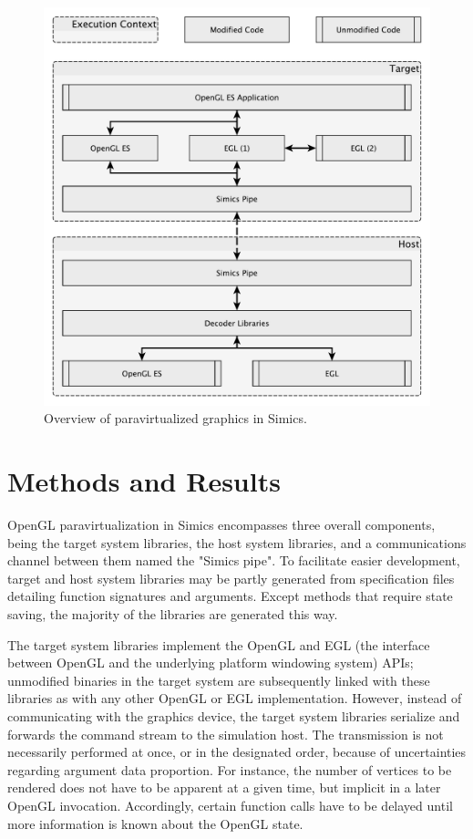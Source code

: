 
\begin{figure}
\setlength{\abovecaptionskip}{0pt}
\setlength{\belowcaptionskip}{0pt}
\centering
\includegraphics[width=\linewidth]{img/yedoverview.pdf}
\caption{Overview of paravirtualized graphics in Simics.}
\label{fig:overview}
\end{figure}

\section{Methods and Results}
\label{sec:methodsandresults}
OpenGL paravirtualization in Simics encompasses three overall components, being the target system libraries, the host system libraries, and a communications channel between them named the "Simics pipe".
To facilitate easier development, target and host system libraries may be partly generated from specification files detailing function signatures and arguments.
Except methods that require state saving, the majority of the libraries are generated this way.

The target system libraries implement the OpenGL and EGL (the interface between OpenGL and the underlying platform windowing system) APIs; unmodified binaries in the target system are subsequently linked with these libraries as with any other OpenGL or EGL implementation.
However, instead of communicating with the graphics device, the target system libraries serialize and forwards the command stream to the simulation host.
The transmission is not necessarily performed at once, or in the designated order, because of uncertainties regarding argument data proportion.
For instance, the number of vertices to be rendered does not have to be apparent at a given time, but implicit in a later OpenGL invocation.
Accordingly, certain function calls have to be delayed until more information is known about the OpenGL state.

